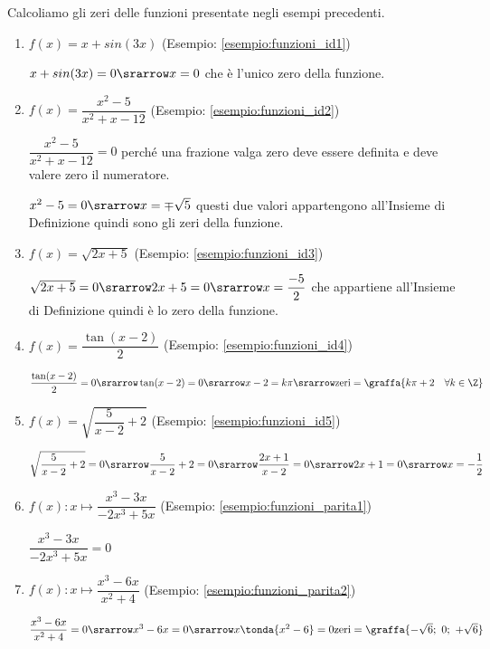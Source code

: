 \begin{esempio}
Calcoliamo gli zeri delle funzioni presentate negli esempi precedenti.
\begin{enumerate}
\item \(f(x) = x +sin(3x)\) \quad (Esempio: \ref{esempio:funzioni_id1})

\(x +sin(3x) = 0 \srarrow x = 0\) che è l'unico zero della funzione.

\item \(f(x) = \dfrac{x^2 -5}{x^2 +x -12}\) \quad 
(Esempio: \ref{esempio:funzioni_id2})

\(\dfrac{x^2 -5}{x^2 +x -12} = 0\) perché una frazione valga zero deve 
essere definita e deve valere zero il numeratore.

\(x^2 -5 = 0 \srarrow x = \mp \sqrt{5}\)
questi due valori appartengono all'Insieme di Definizione quindi sono gli 
zeri della funzione.

\item \(f(x) = \sqrt{2x +5}\) \quad 
(Esempio: \ref{esempio:funzioni_id3}) 

\(\sqrt{2x +5} = 0 \srarrow 2x +5 = 0 \srarrow x = \dfrac{-5}{2}\)
che appartiene all'Insieme di Definizione quindi è lo zero della funzione.

\item \(f(x) = \dfrac{\tan(x -2)}{2}\) \quad 
(Esempio: \ref{esempio:funzioni_id4}) 

\(\dfrac{\tan(x -2)}{2} = 0 \srarrow \tan(x -2) = 0 \srarrow 
  x -2 = k \pi \srarrow 
  \text{zeri} = \graffa{k \pi +2 \quad \forall k \in \Z}\) 

\item \(f(x) = \sqrt{\dfrac{5}{x-2}+2}\) \quad 
(Esempio: \ref{esempio:funzioni_id5})

\(\sqrt{\dfrac{5}{x-2}+2} = 0 \srarrow \dfrac{5}{x-2}+2 = 0 \srarrow
\dfrac{2x +1}{x-2} = 0 \srarrow 2x +1 = 0 \srarrow x = -\dfrac{1}{2}\)

\item  \quad \(f(x): x \mapsto \dfrac{x^3 -3x}{-2x^3+5x}\)
(Esempio: \ref{esempio:funzioni_parita1})

\(\dfrac{x^3 -3x}{-2x^3+5x} = 0\)

\item  \quad \(f(x): x \mapsto \dfrac{x^3 -6x}{x^2+4}\)
(Esempio: \ref{esempio:funzioni_parita2})

\(\dfrac{x^3 -6x}{x^2+4} = 0 \srarrow x^3 -6x = 0 \srarrow 
  x\tonda{x^2 -6} = 0 
\text{zeri} = \graffa{-\sqrt{6};~0;~+\sqrt{6}}\)


\end{enumerate}
\end{esempio}
